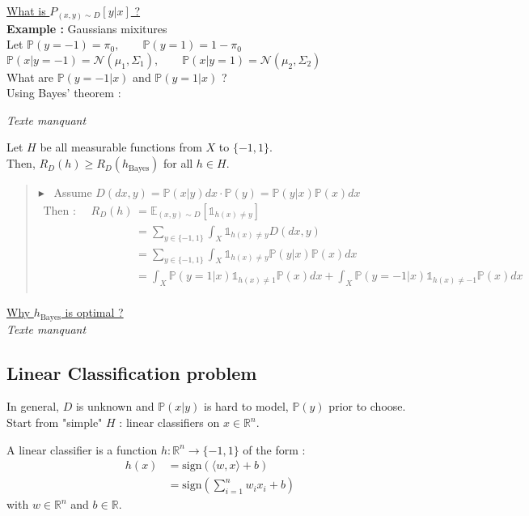 \documentclass[12pt,a4paper]{article}
\newcommand{\definition}[2]{%
    \begin{tcolorbox}[colback=white,colframe=blue!25!white,title=\textbf{Définition #1}, coltitle=black]
        #2
    \end{tcolorbox}
}
\newcommand{\theoreme}[2]{%
    \begin{tcolorbox}[colback=white,colframe=red!25!white,title=\textbf{Théorème #1}, coltitle=black]
        #2
    \end{tcolorbox}
}
\newcommand{\preuve}[1]{%
    \begin{quote}
        $\blacktriangleright$~#1
    \end{quote}
}
\begin{document}
\noindent\underline{What is $P_{(x, y) \sim D} [y|x]$ ?}\\

\textbf{Example :} 
Gaussians mixitures \\
Let $\mathbb{P}(y = -1) = \pi_0, \qquad 
\mathbb{P}(y = 1) = 1 - \pi_0$ \\
$\mathbb{P}(x|y = -1) = \mathcal{N}(\mu_1, \Sigma_1), \qquad 
\mathbb{P}(x|y = 1) = \mathcal{N}(\mu_2, \Sigma_2)$\\

What are $\mathbb{P}(y = -1|x)$ and $\mathbb{P}(y = 1|x)$ ?\\

Using Bayes' theorem :

\textit{Texte manquant}


\theoreme{}{
    Let $H$ be all measurable functions from $X$ to $\{-1, 1\}$. \\
    Then, $R_D(h) \geq R_D(h_{\text{Bayes}})$ for all $h \in H$.
}

\preuve{
    Assume $D(dx, y) = \mathbb{P}(x | y)dx \cdot \mathbb{P}(y) = \mathbb{P}(y | x)\mathbb{P}(x)dx$
    \begin{align*}
        \text{Then : } \quad R_D(h) &= \mathbb{E}_{(x, y) \sim D} [\mathds{1}_{h(x) \neq y}] \\
        &= \sum_{y \in \{-1, 1\}} \int_X \mathds{1}_{h(x) \neq y} D(dx, y) \\
        &= \sum_{y \in \{-1, 1\}} \int_X \mathds{1}_{h(x) \neq y} \mathbb{P}(y | x)\mathbb{P}(x)dx \\
        &= \int_X \mathbb{P}(y = 1 | x) \mathds{1}_{h(x) \neq 1} \mathbb{P}(x)dx + \int_X \mathbb{P}(y = -1 | x) \mathds{1}_{h(x) \neq -1} \mathbb{P}(x)dx \\
    \end{align*}
}

\noindent\underline{Why $h_{\text{Bayes}}$ is optimal ?} \\

\textit{Texte manquant}



\subsection{Linear Classification problem}

In general, $D$ is unknown and $\mathbb{P}(x|y)$ is hard to model, $\mathbb{P}(y)$ prior to choose.\\
Start from "simple" $H$ : linear classifiers on $x \in \mathbb{R}^n$.

\definition{- Linear classifier}{
    A linear classifier is a function $h : \mathbb{R}^n \to \{-1, 1\}$ of the form :
    \begin{align*}
        h(x) &= \text{sign}(\langle w, x \rangle + b) \\
        &= \text{sign}(\sum_{i = 1}^n w_i x_i + b)
    \end{align*}
    with $w \in \mathbb{R}^n$ and $b \in \mathbb{R}$.
}
\end{document}
